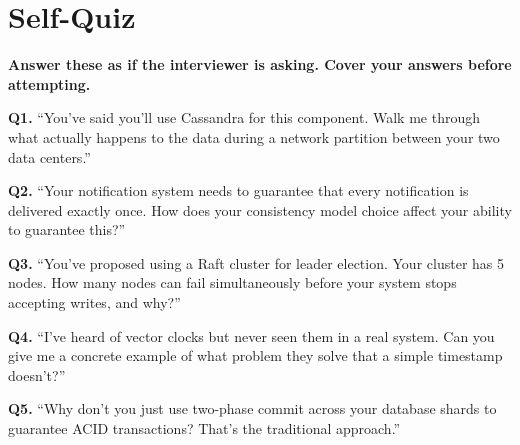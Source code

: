 \documentclass[11pt,a4paper]{article}
\begin{document}
\section{Self-Quiz}

\begin{quizbox}
\textbf{Answer these as if the interviewer is asking. Cover your answers before attempting.}

\vspace{0.5em}

\textbf{Q1.} ``You've said you'll use Cassandra for this component. Walk me through what actually happens to the data during a network partition between your two data centers.''

\vspace{0.8em}

\textbf{Q2.} ``Your notification system needs to guarantee that every notification is delivered exactly once. How does your consistency model choice affect your ability to guarantee this?''

\vspace{0.8em}

\textbf{Q3.} ``You've proposed using a Raft cluster for leader election. Your cluster has 5 nodes. How many nodes can fail simultaneously before your system stops accepting writes, and why?''

\vspace{0.8em}

\textbf{Q4.} ``I've heard of vector clocks but never seen them in a real system. Can you give me a concrete example of what problem they solve that a simple timestamp doesn't?''

\vspace{0.8em}

\textbf{Q5.} ``Why don't you just use two-phase commit across your database shards to guarantee ACID transactions? That's the traditional approach.''
\end{quizbox}

\newpage
\end{document}
